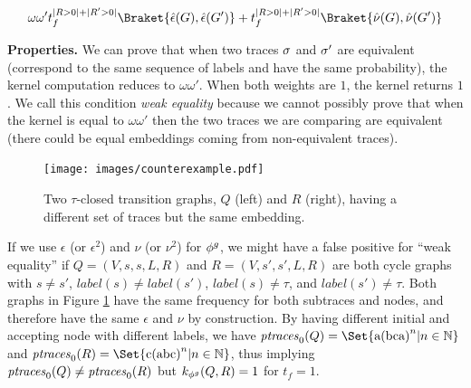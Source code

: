 
\begin{equation}\label{eq:corollLem1}
{\omega\omega't_f^{|R>0|+|R'>0|}\Braket{\hat{\epsilon}(G), \hat{\epsilon}(G')}+ t_f^{|R>0|+|R'>0|}\Braket{\hat{\nu}(G), \hat{\nu}(G')}}
\end{equation}

\noindent
\textbf{Properties.}\label{subsub:prop}
We can prove that when two traces $\logtrace$ and ${\nonlogtrace}$ are equivalent (correspond to the same sequence of labels and have the same probability), the kernel computation reduces to $\omega\omega'$. When both weights are $1$, the kernel returns $1$. We call this condition \textit{weak equality} because we cannot possibly prove that when the kernel is equal to $\omega\omega'$ then the two traces we are comparing are equivalent (there could be equal embeddings coming from non-equivalent traces). 

\begin{figure}[!t]
	\vspace*{-0.5cm}
	\centering
	\texttt{[image: images/counterexample.pdf]}
	\caption{Two $\tau$-closed transition graphs, $Q$ (left) and $R$ (right), having a different set of traces but the same embedding.}\label{fig:counterexample}
\end{figure}
\begin{example}
	If we use $\epsilon$ (or $\epsilon^2$) and $\nu$ (or $\nu^2$) for $\gorgembed$, we might have a false positive for ``weak equality'' if $Q=(V,s,s,L,R)$ and $R=(V,s',s',L,R)$ are both cycle graphs with $s\neq s'$, $\textit{label}(s)\neq\textit{label}(s')$, $\textit{label}(s)\neq\tau$, and $\textit{label}(s')\neq\tau$. Both graphs in Figure \ref{fig:counterexample} have the same frequency for both subtraces and nodes, and therefore have the same  $\epsilon$ and $\nu$ by construction. By having different initial and accepting node with  different labels, we have $\ptraces{Q}{0}=\Set{\textup{a(bca)}^n|n\in\mathbb{N}}$ and $\ptraces{R}{0}=\Set{\textup{c(abc)}^n|n\in\mathbb{N}}$, thus implying $\ptraces{Q}{0}\neq\ptraces{R}{0}$ but $k_{\gorgembed}(Q,R)=1$ for $t_f=1$.
\end{example}


